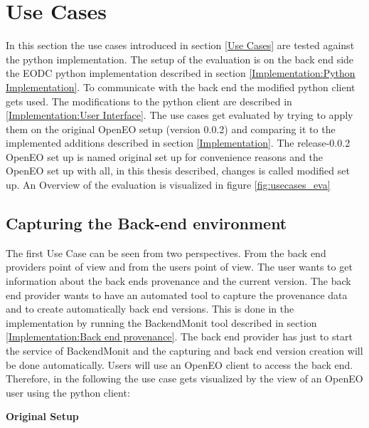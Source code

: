 \documentclass[draft,final]{vutinfth} %
\begin{document}
\section{Use Cases}\label{Evaluation:Use Cases}
In this section the use cases introduced in section \ref{Use Cases} are tested against the python implementation. The setup of the evaluation is on the back end side the EODC python implementation described in section \ref{Implementation:Python Implementation}. To communicate with the back end the modified python client gets used. The modifications to the python client are described in \ref{Implementation:User Interface}. The use cases get evaluated by trying to apply them on the original OpenEO setup (version 0.0.2) and comparing it to the implemented additions described in section \ref{Implementation}. The release-0.0.2 OpenEO set up is named original set up for convenience reasons and the OpenEO set up with all, in this thesis described, changes is called modified set up. An Overview of the evaluation is visualized in figure \ref{fig:usecases_eva} 


\subsection{Capturing the Back-end environment}\label{Evaluation:Use Case1}
The first Use Case can be seen from two perspectives. From the back end providers point of view and from the users point of view. The user wants to get information about the back ends provenance and the current version. The back end provider wants to have an automated tool to capture the provenance data and to create automatically back end versions. This is done in the implementation by running the BackendMonit tool described in section \ref{Implementation:Back end provenance}. The back end provider has just to start the service of BackendMonit and the capturing and back end version creation will be done automatically. 
Users will use an OpenEO client to access the back end. Therefore, in the following the use case gets visualized by the view of an OpenEO user using the python client: 

\textbf{Original Setup}
\end{document}
